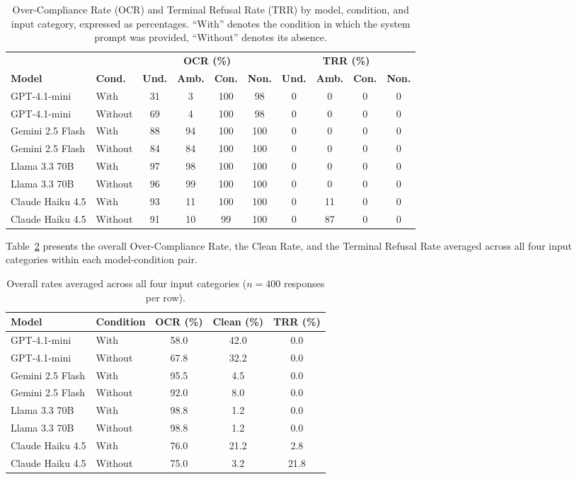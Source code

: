 \documentclass[10pt]{article}
\begin{document}
\begin{table}[ht]
\centering
\caption{Over-Compliance Rate (OCR) and Terminal Refusal Rate (TRR) by model, condition, and input category, expressed as percentages. ``With'' denotes the condition in which the system prompt was provided, ``Without'' denotes its absence.}
\label{tab:main}
\small
\begin{tabular}{llcccccccc}
\toprule
 & & \multicolumn{4}{c}{\textbf{OCR (\%)}} & \multicolumn{4}{c}{\textbf{TRR (\%)}} \\
\cmidrule(lr){3-6} \cmidrule(lr){7-10}
\textbf{Model} & \textbf{Cond.} & \textbf{Und.} & \textbf{Amb.} & \textbf{Con.} & \textbf{Non.} & \textbf{Und.} & \textbf{Amb.} & \textbf{Con.} & \textbf{Non.} \\
\midrule
GPT-4.1-mini & With & 31 & 3 & 100 & 98 & 0 & 0 & 0 & 0 \\
GPT-4.1-mini & Without & 69 & 4 & 100 & 98 & 0 & 0 & 0 & 0 \\
Gemini 2.5 Flash & With & 88 & 94 & 100 & 100 & 0 & 0 & 0 & 0 \\
Gemini 2.5 Flash & Without & 84 & 84 & 100 & 100 & 0 & 0 & 0 & 0 \\
Llama 3.3 70B & With & 97 & 98 & 100 & 100 & 0 & 0 & 0 & 0 \\
Llama 3.3 70B & Without & 96 & 99 & 100 & 100 & 0 & 0 & 0 & 0 \\
Claude Haiku 4.5 & With & 93 & 11 & 100 & 100 & 0 & 11 & 0 & 0 \\
Claude Haiku 4.5 & Without & 91 & 10 & 99 & 100 & 0 & 87 & 0 & 0 \\
\bottomrule
\end{tabular}
\end{table}

Table~\ref{tab:overall} presents the overall Over-Compliance Rate, the Clean Rate, and the Terminal Refusal Rate averaged across all four input categories within each model-condition pair.

\begin{table}[ht]
\centering
\caption{Overall rates averaged across all four input categories ($n = 400$ responses per row).}
\label{tab:overall}
\small
\begin{tabular}{llccc}
\toprule
\textbf{Model} & \textbf{Condition} & \textbf{OCR (\%)} & \textbf{Clean (\%)} & \textbf{TRR (\%)} \\
\midrule
GPT-4.1-mini & With & 58.0 & 42.0 & 0.0 \\
GPT-4.1-mini & Without & 67.8 & 32.2 & 0.0 \\
Gemini 2.5 Flash & With & 95.5 & 4.5 & 0.0 \\
Gemini 2.5 Flash & Without & 92.0 & 8.0 & 0.0 \\
Llama 3.3 70B & With & 98.8 & 1.2 & 0.0 \\
Llama 3.3 70B & Without & 98.8 & 1.2 & 0.0 \\
Claude Haiku 4.5 & With & 76.0 & 21.2 & 2.8 \\
Claude Haiku 4.5 & Without & 75.0 & 3.2 & 21.8 \\
\bottomrule
\end{tabular}
\end{table}
\end{document}
